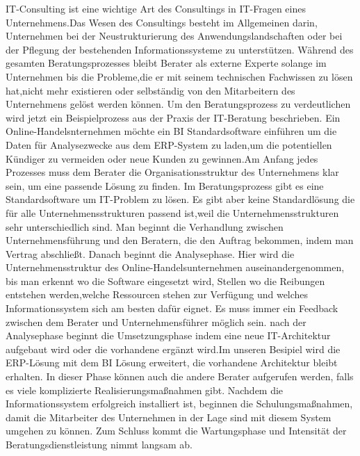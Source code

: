 IT-Consulting ist eine wichtige Art des Consultings in IT-Fragen eines Unternehmens.Das Wesen des Consultings besteht im Allgemeinen darin, Unternehmen bei der Neustrukturierung des Anwendungslandschaften oder bei der Pflegung der bestehenden Informationssysteme zu unterstützen. Während des gesamten Beratungsprozesses bleibt Berater als externe Experte solange im Unternehmen bis die Probleme,die er mit seinem technischen Fachwissen zu lösen hat,nicht mehr existieren oder selbständig von den Mitarbeitern des Unternehmens gelöst werden können.
Um den Beratungsprozess zu verdeutlichen wird jetzt ein Beispielprozess aus der Praxis der IT-Beratung beschrieben. Ein Online-Handelsnternehmen möchte ein BI Standardsoftware einführen um die Daten für Analysezwecke aus dem ERP-System zu laden,um die potentiellen Kündiger zu vermeiden oder neue Kunden zu gewinnen.Am Anfang jedes Prozesses muss dem Berater die Organisationsstruktur des Unternehmens klar sein, um eine passende Lösung zu finden. Im Beratungsprozess gibt es eine Standardsoftware um IT-Problem zu lösen. Es gibt aber keine Standardlösung die für alle Unternehmensstrukturen passend ist,weil die Unternehmensstrukturen sehr unterschiedlich sind. Man beginnt die Verhandlung zwischen Unternehmensführung und den Beratern, die den Auftrag bekommen, indem man Vertrag abschließt. Danach beginnt die Analysephase. Hier wird die Unternehmensstruktur des Online-Handelsunternehmen auseinandergenommen, bis man erkennt wo die Software eingesetzt wird, Stellen wo die Reibungen entstehen werden,welche Ressourcen stehen zur Verfügung und welches Informationssystem sich am besten dafür eignet.
Es muss immer ein Feedback zwischen dem Berater und Unternehmensführer möglich sein.
nach der Analysephase beginnt die Umsetzungsphase indem eine neue IT-Architektur aufgebaut wird oder die vorhandene ergänzt wird.Im unseren Besipiel wird die ERP-Lösung mit dem BI Lösung erweitert, die vorhandene Architektur bleibt erhalten. In dieser Phase können auch die andere Berater aufgerufen werden, falls es viele komplizierte Realisierungsmaßnahmen gibt.
Nachdem die Informationssystem erfolgreich installiert ist, beginnen die Schulungsmaßnahmen, damit die Mitarbeiter des Unternehmen in der Lage sind mit diesem System umgehen zu können. Zum Schluss kommt die Wartungsphase und Intensität der Beratungsdienstleistung nimmt langsam ab. 
